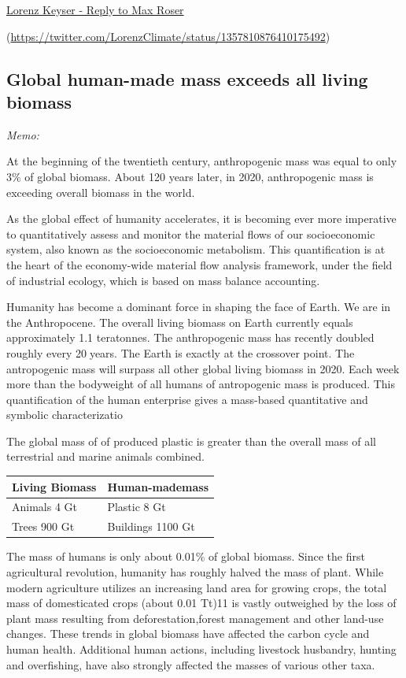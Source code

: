 \documentclass[
]{book}
\begin{document}
\href{https://degrowth.org/2021/02/06/aggregate-material-footprint-as-a-proxy-for-environmental-pressures/}{Lorenz Keyser - Reply to Max Roser}

\citep[ Twitter Thread]{LorenzClimate}(\url{https://twitter.com/LorenzClimate/status/1357810876410175492})

\hypertarget{global-human-made-mass-exceeds-all-living-biomass}{%
\subsection{Global human-made mass exceeds all living biomass}\label{global-human-made-mass-exceeds-all-living-biomass}}

\emph{Memo:}

At the beginning of the twentieth century, anthropogenic mass was equal to only 3\% of global biomass.
About 120 years later, in 2020, anthropogenic mass is exceeding overall biomass in the world.

As the global effect of humanity accelerates, it is becoming ever more imperative
to quantitatively assess and monitor the material flows of our socioeconomic system,
also known as the socioeconomic metabolism.
This quantification is at the heart of the economy-wide material flow analysis framework,
under the field of industrial ecology, which is based on mass balance accounting.

Humanity has become a dominant force in shaping the face of Earth.
We are in the Anthropocene.
The overall living biomass on Earth currently equals approximately 1.1 teratonnes.
The anthropogenic mass has recently doubled roughly every 20years.
The Earth is exactly at the crossover point.
The antropogenic mass will surpass all other global living biomass in 2020.
Each week more than the bodyweight of all humans of antropogenic mass is produced.
This quantification of the human enterprise gives a mass-based quantitative and symbolic characterizatio

The global mass of of produced plastic is greater than the overall mass of all terrestrial and marine animals combined.

\begin{longtable}[]{@{}ll@{}}
\toprule
Living Biomass & Human-mademass\tabularnewline
\midrule
\endhead
Animals 4 Gt & Plastic 8 Gt\tabularnewline
Trees 900 Gt & Buildings 1100 Gt\tabularnewline
\bottomrule
\end{longtable}

The mass of humans is only about 0.01\% of global biomass.
Since the first agricultural revolution, humanity has roughly halved the mass of plant.
While modern agriculture utilizes an increasing land area for growing crops,
the total mass of domesticated crops (about 0.01 Tt)11 is vastly outweighed by
the loss of plant mass resulting from deforestation,forest management and other land-use changes.
These trends in global biomass have affected the carbon cycle and human health.
Additional human actions, including livestock husbandry, hunting and overfishing,
have also strongly affected the masses of various other taxa.
\end{document}
